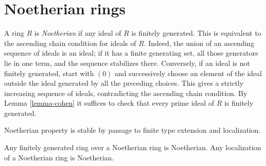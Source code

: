 \section{Noetherian rings}
\label{section-Noetherian}

\noindent
A ring $R$ is {\it Noetherian} if any ideal of $R$ is finitely generated.
This is equivalent to the ascending chain condition for ideals of $R$.
Indeed, the union of an ascending sequence of ideals is an ideal; if
it has a finite generating set, all those generators lie in one term,
and the sequence stabilizes there. Conversely, if an ideal is not
finitely generated, start with $(0)$ and successively choose an element
of the ideal outside the ideal generated by all the preceding choices.
This gives a strictly increasing sequence of ideals, contradicting
the ascending chain condition.
By
Lemma \ref{lemma-cohen}
it suffices to check that every prime ideal of $R$ is finitely generated.

\begin{lemma}
\label{lemma-Noetherian-permanence}
\begin{slogan}
Noetherian property is stable by passage to finite type extension
and localization.
\end{slogan}
Any finitely generated ring over a Noetherian ring
is Noetherian. Any localization of a Noetherian ring
is Noetherian.
\end{lemma}


